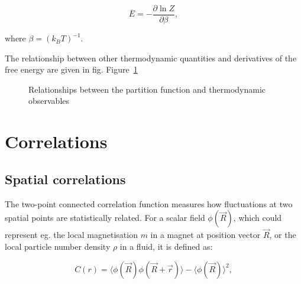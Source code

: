 \documentclass[
  letterpaper,
  enabledeprecatedfontcommands]{report}
\begin{document}
\[\overline{E}=-\frac{\partial \ln Z}{\partial \beta},\]

where \(\beta=(k_BT)^{-1}\).

The relationship between other thermodynamic quantities and derivatives
of the free energy are given in fig. Figure~\ref{fig-thermo}

\begin{figure}


\caption{\label{fig-thermo}Relationships between the partition function
and thermodynamic observables}

\end{figure}%

\section{Correlations}\label{sec-correlations}

\subsection{Spatial correlations}\label{spatial-correlations}

The two-point connected correlation function measures how fluctuations
at two spatial points are statistically related. For a scalar field
\(\phi(\vec{R})\), which could represent eg. the local magnetisation
\(m\) in a magnet at position vector \(\vec{R}\), or the local particle
number density \(\rho\) in a fluid, it is defined as:

\[
C(r) = \langle \phi(\vec{R}) \phi(\vec{R} + \vec{r}) \rangle - \langle \phi(\vec{R}) \rangle^2,
\]
\end{document}
